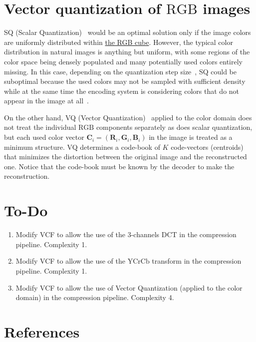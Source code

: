 \section{Vector quantization of $\text{RGB}$ images}

SQ (Scalar
Quantization)~\cite{vruiz__scalar_quantization,sayood2017introduction}
would be an optimal solution only if the image colors are uniformly
distributed within
\href{https://en.wikipedia.org/wiki/RGB_color_model}{the RGB
  cube}. However, the typical color distribution in natural images is
anything but uniform, with some regions of the color space being
densely populated and many potentially used colors entirely
missing. In this case, depending on the quantization step
size~\cite{vruiz__signal_quantization}, SQ could be suboptimal because
the used colors may not be sampled with suﬃcient density while at the
same time the encoding system is considering colors that do not appear
in the image at all~\cite{burger2016digital}.

On the other hand, VQ (Vector
Quantization)~\cite{vruiz__vector_quantization,sayood2017introduction}
applied to the color domain does not treat the individual $\text{RGB}$
components separately
as does scalar quantization, but each used color vector ${\mathbf C}_i
= ({\mathbf R}_i, {\mathbf G}_i, {\mathbf B}_i )$ in the image is
treated as a minimum structure. VQ determines a code-book of $K$ code-vectors (centroids) that minimizes the distortion between the original image and the reconstructed one. Notice that the code-book must be known by the decoder to make the reconstruction.

\section{To-Do}
\begin{enumerate}
\item Modify VCF to allow the use of the 3-channels DCT in the
  compression pipeline. Complexity 1.
\item Modify VCF to allow the use of the $\text{YCrCb}$ transform in
  the compression pipeline. Complexity 1.
\item Modify VCF to allow the use of Vector Quantization (applied to
  the color domain) in the compression pipeline. Complexity 4.
\end{enumerate}

\section{References}

\renewcommand{\addcontentsline}[3]{}%

